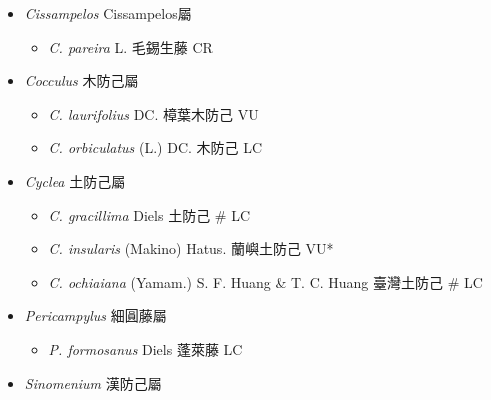 
  \begin{itemize}
 \item[] \textit{Cissampelos} Cissampelos屬
                                
  \begin{itemize}
        \item[] \textit{C. pareira} L.  毛錫生藤   CR
  \end{itemize}
 \item[] \textit{Cocculus} 木防己屬
                                
  \begin{itemize}
        \item[] \textit{C. laurifolius} DC.  樟葉木防己   VU
        \item[] \textit{C. orbiculatus} (L.) DC.  木防己   LC
  \end{itemize}
 \item[] \textit{Cyclea} 土防己屬
                                
  \begin{itemize}
        \item[] \textit{C. gracillima} Diels  土防己  \# LC
        \item[] \textit{C. insularis} (Makino) Hatus.  蘭嶼土防己   VU*
        \item[] \textit{C. ochiaiana} (Yamam.) S. F. Huang \& T. C. Huang  臺灣土防己  \# LC
  \end{itemize}
 \item[] \textit{Pericampylus} 細圓藤屬
                                
  \begin{itemize}
        \item[] \textit{P. formosanus} Diels  蓬萊藤   LC
  \end{itemize}
 \item[] \textit{Sinomenium} 漢防己屬
                                

\end{itemize}

